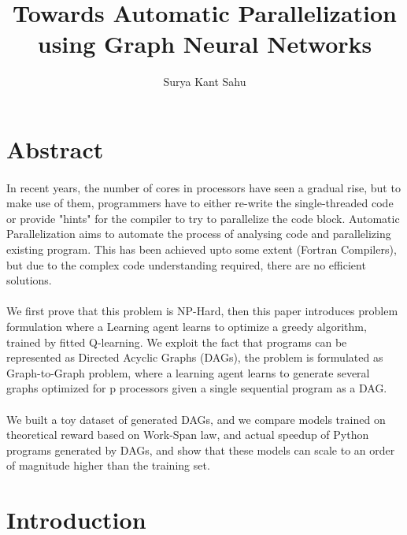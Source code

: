 \documentclass[a4paper,twocolumn]{article}
\title{Towards Automatic Parallelization using Graph Neural Networks}
\author{Surya Kant Sahu}
\begin{document}
    \maketitle
    \section{Abstract}
        \paragraph{}
    In recent years, the number of cores in processors have seen a gradual rise, but to make use of them, programmers have to either re-write the single-threaded code or provide "hints" for the compiler to try to parallelize the code block. Automatic Parallelization aims to automate the process of analysing code and parallelizing existing program. This has been achieved upto some extent (Fortran Compilers), but due to the complex code understanding required, there are no efficient solutions. 
        \paragraph{}
    We first prove that this problem is NP-Hard, then this paper introduces problem formulation where a Learning agent learns to optimize a greedy algorithm, trained by fitted Q-learning. We exploit the fact that programs can be represented as Directed Acyclic Graphs (DAGs), the problem is formulated as Graph-to-Graph problem, where a learning agent learns to generate several graphs optimized for p processors given a single sequential program as a DAG.
        \paragraph{}
    We built a toy dataset of generated DAGs, and we compare models trained on theoretical reward based on Work-Span law, and actual speedup of Python programs generated by DAGs, and show that these models can scale to an order of magnitude higher than the training set.

\section{Introduction}
\end{document}
